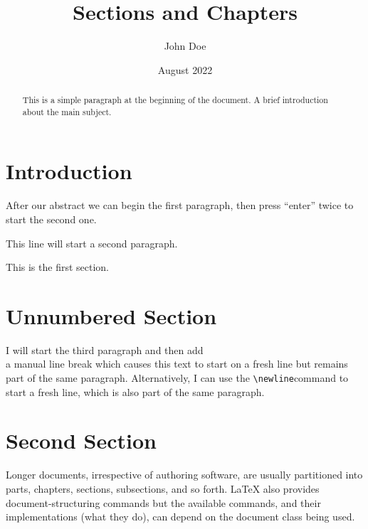 \documentclass{article}
\title{Sections and Chapters}
\author{John Doe}
\date{August 2022}
\begin{document}
\maketitle

\begin{abstract}
  This is a simple paragraph at the beginning of the
  document. A brief introduction about the main subject.
\end{abstract}

\tableofcontents

\section{Introduction}


After our abstract we can begin the first paragraph, then press ``enter'' twice to start the second one.

This line will start a second paragraph.

This is the first section.

\section*{Unnumbered Section}

I will start the third paragraph and then add \\ a manual line break which causes this text to start on a fresh line but remains part of the same paragraph. Alternatively, I can use the \verb|\newline|\newline command to start a fresh line, which is also part of the same paragraph.

\section{Second Section}

Longer documents, irrespective of authoring software, are usually partitioned into parts, chapters, sections, subsections, and so forth. LaTeX also provides document-structuring commands but the available commands, and their implementations (what they do), can depend on the document class being used.
\end{document}
